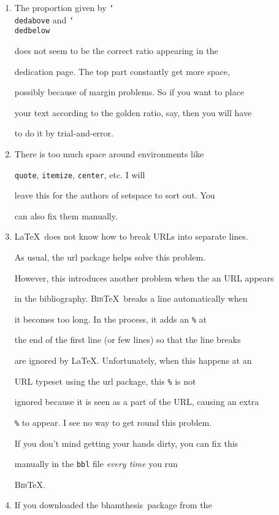\documentclass{bhamthesis}
\providecommand{\BibTeX}{\textsc{Bib}\TeX}
\newcommand{\clsname}{\pkg{bhamthesis}}
\newcommand{\bksl}{\char`\\}
\newcommand{\cmd}[1]{\texttt{\bksl{}#1}}
\newcommand{\pkg}[1]{\textsf{#1}}
\newcommand{\env}[1]{\texttt{#1}}
\newcommand{\ext}[1]{\texttt{#1}}
\begin{document}
\begin{enumerate}

\item The proportion given by \cmd{dedabove} and \cmd{dedbelow}

  does not seem to be the correct ratio appearing in the

  dedication page.  The top part constantly get more space,

  possibly because of margin problems.  So if you want to place

  your text according to the golden ratio, say, then you will have

  to do it by trial-and-error.

\item There is too much space around environments like

  \env{quote}, \env{itemize}, \env{center}, etc.  I will

  leave this for the authors of \pkg{setspace} to sort out.  You

  can also fix them manually.

\item \LaTeX\ does not know how to break URLs into separate lines.

  As usual, the \pkg{url} package helps solve this problem.

  However, this introduces another problem when the an URL appears

  in the bibliography.  \BibTeX\ breaks a line automatically when

  it becomes too long.  In the process, it adds an \texttt\% at

  the end of the first line (or few lines) so that the line breaks

  are ignored by \LaTeX.  Unfortunately, when this happens at an

  URL typeset using the \pkg{url} package, this \texttt\% is not

  ignored because it is seen as a part of the URL, causing an extra

  \texttt\% to appear.  I see no way to get round this problem.

  If you don't mind getting your hands dirty, you can fix this

  manually in the \ext{bbl} file \emph{every time} you run

  \BibTeX.

\item If you downloaded the \clsname\ package from the


\end{enumerate}
\end{document}
